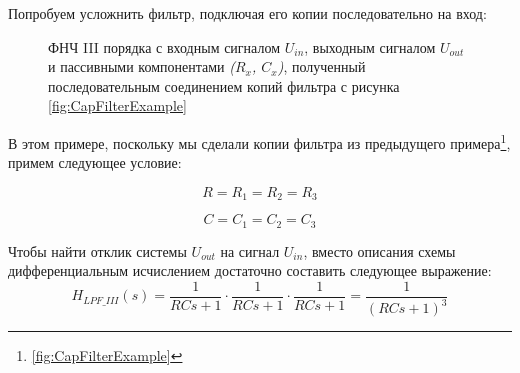 \documentclass[a4paper, 10pt, final]{article} %
\begin{document}
    \noindent Попробуем усложнить фильтр, подключая его копии последовательно на вход:
    \begin{figure}[H]
        \centering
        \caption{ФНЧ III порядка с входным сигналом $U_{in}$, выходным сигналом $U_{out}$ и пассивными компонентами \emph{($R_x$, $C_x$)}, полученный последовательным соединением копий фильтра с рисунка \ref{fig:CapFilterExample}}
        \label{fig:CapFilterExample2}
    \end{figure}
    \noindent В этом примере, поскольку мы сделали копии фильтра из предыдущего примера\footnote{\ref{fig:CapFilterExample}}, примем следующее условие:
    \begin{figure}[H]
        \centering
        \begin{minipage}[b]{.31\linewidth}
            \centering
            \begin{equation*}
                R = R_1 = R_2 = R_3
            \end{equation*}
        \end{minipage}
        \hspace{0.04\linewidth}
        \begin{minipage}[b]{.31\linewidth}
            \centering
            \begin{equation*}
                C = C_1 = C_2 = C_3
            \end{equation*}
        \end{minipage}
    \end{figure}
    \noindent Чтобы найти отклик системы $U_{out}$ на сигнал $U_{in}$, вместо описания схемы дифференциальным исчислением достаточно составить следующее выражение:
    \begin{equation*}
        H_{LPF\_III}(s) = \frac{1}{RCs+1} \cdot \frac{1}{RCs+1} \cdot \frac{1}{RCs+1} = \frac{1}{\left(RCs+1\right)^3}
    \end{equation*}
\end{document}
